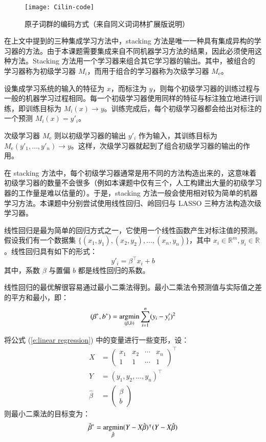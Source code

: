 \begin{figure}[h]
	\centering
	\texttt{[image: Cilin-code]}
	\caption{原子词群的编码方式（来自同义词词林扩展版说明）}
	\label{f:cilin code}
	\vspace{-1em}
\end{figure}

在上文中提到的三种集成学习方法中，stacking 方法是唯一一种具有集成异构的学习器的方法。由于本课题需要集成来自不同机器学习方法的结果，因此必须使用这种方法。Stacking 方法用一个学习器来组合其它学习器的输出。其中，被组合的学习器称为初级学习器 $M_i$，而用于组合的学习器称为次级学习器 $M_\text{e}$。

设集成学习系统的输入的特征为 $x$，而标注为 $y$，则每个初级学习器的训练过程与一般的机器学习过程相同。每一个初级学习器使用同样的特征与标注独立地进行训练，即训练目标为 $M_i(x) \rightarrow y$。训练完成后，每个初级学习器都会给出对标注的一个预测 $M_i(x) = y'_i$。

次级学习器 $M_\text{e}$ 则以初级学习器的输出 $y'_i$ 作为输入，其训练目标为 $M_\text{e}(y'_1, \dots, y'_n) \rightarrow y$。这样，次级学习器就起到了组合初级学习器的输出的作用。

在 stacking 方法中，每个初级学习器通常是用不同的方法构造出来的，这意味着初级学习器的数量不会很多（例如本课题中仅有三个，人工构建出大量的初级学习器的工作量是难以估量的）。于是，stacking 方法一般会使用相对较为简单的机器学习方法。本课题中分别尝试使用线性回归、岭回归与 LASSO 三种方法构造次级学习器。

线性回归是最为简单的回归方式之一，它使用一个线性函数产生对标注值的预测。假设我们有一个数据集 $\bigl\{(x_1, y_1), (x_2, y_2), \dots, (x_n, y_n)\bigr\}$，其中 $x_i \in \mathbb{R}^m, y_i \in \mathbb{R}$。线性回归具有如下的形式：
\begin{equation}
y'_i = \beta^\intercal x_i + b
\label{e:linear regression}
\end{equation}
其中，系数 $\beta$ 与置偏 $b$ 都是线性回归的系数。

线性回归的最优解很容易通过最小二乘法得到。最小二乘法令预测值与实际值之差的平方和最小，即：
\begin{equation}
(\beta^*, b^*) = \operatorname*{argmin}_{(\beta, b)} \sum_{i = 1}^{n} (y_i - y'_i)^2
\end{equation}

将公式 (\ref{e:linear regression}) 中的变量进行一些变形，设：
\begin{align}
	X &=
	\begin{pmatrix}
		x_1 & x_2 & \cdots & x_n \\
		1 & 1 & \cdots & 1
	\end{pmatrix}^\intercal \\
	Y &= (y_1, y_2, \dots, y_n)^\intercal\\
	\hat{\beta} &=
	\begin{pmatrix}
		\beta \\
		b
	\end{pmatrix}
\end{align}
则最小二乘法的目标变为：
\begin{equation}
\hat{\beta}^* = \operatorname*{argmin}_{\hat{\beta}} (Y - X \hat{\beta})^\intercal (Y - X \hat{\beta})
\end{equation}

